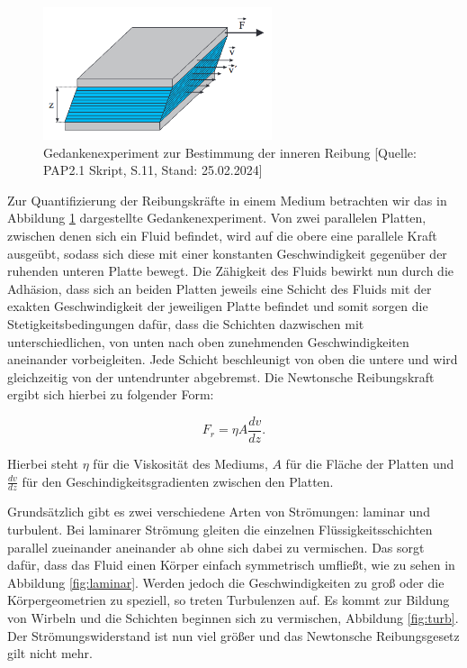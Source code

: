 \documentclass{article}
\begin{document}
\begin{figure}[!h]
    \centering
    \includegraphics[width=0.6\textwidth]{graphics/gedankenexp.png}
    \caption{Gedankenexperiment zur Bestimmung der inneren Reibung [Quelle: PAP2.1 Skript, S.11, Stand: 25.02.2024]}
    \label{fig:gedankenexp}
\end{figure}

Zur Quantifizierung der Reibungskräfte in einem Medium betrachten wir das in Abbildung \ref{fig:gedankenexp} dargestellte Gedankenexperiment. Von zwei parallelen Platten, zwischen denen sich ein Fluid befindet, wird auf die obere eine parallele Kraft ausgeübt, sodass sich diese mit einer konstanten Geschwindigkeit gegenüber der ruhenden unteren Platte bewegt. Die Zähigkeit des Fluids bewirkt nun durch die Adhäsion, dass sich an beiden Platten jeweils eine Schicht des Fluids mit der exakten Geschwindigkeit der jeweiligen Platte befindet und somit sorgen die Stetigkeitsbedingungen dafür, dass die Schichten dazwischen mit unterschiedlichen, von unten nach oben zunehmenden Geschwindigkeiten aneinander vorbeigleiten. Jede Schicht beschleunigt von oben die untere und wird gleichzeitig von der untendrunter abgebremst. Die Newtonsche Reibungskraft ergibt sich hierbei zu folgender Form:

\begin{equation}
    F_r = \eta A \frac{dv}{dz}.
    \label{eq:NewtonReibung}
\end{equation}

Hierbei steht $\eta$ für die Viskosität des Mediums, $A$ für die Fläche der Platten und $\frac{dv}{dz}$ für den Geschindigkeitsgradienten zwischen den Platten. 

Grundsätzlich gibt es zwei verschiedene Arten von Strömungen: laminar und turbulent. Bei laminarer Strömung gleiten die einzelnen Flüssigkeitsschichten parallel zueinander aneinander ab ohne sich dabei zu vermischen. Das sorgt dafür, dass das Fluid einen Körper einfach symmetrisch umfließt, wie zu sehen in Abbildung \ref{fig:laminar}. Werden jedoch die Geschwindigkeiten zu groß oder die Körpergeometrien zu speziell, so treten Turbulenzen auf. Es kommt zur Bildung von Wirbeln und die Schichten beginnen sich zu vermischen, Abbildung \ref{fig:turb}. Der Strömungswiderstand ist nun viel größer und das Newtonsche Reibungsgesetz gilt nicht mehr.
\end{document}
